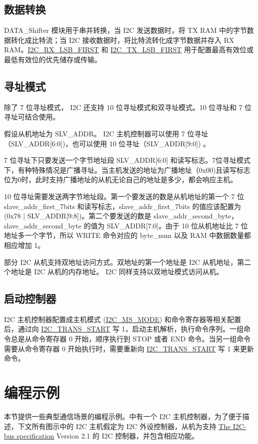 \documentclass[main\_\_CN.tex]{subfiles}
\begin{document}
\subsection{数据转换}
DATA\_Shifter 模块用于串并转换，当 I2C 发送数据时，将 TX RAM 中的字节数据转化成比特流；当 I2C 接收数据时，将比特流转化成字节数据并存入 RX RAM。\hyperref[fielddesc:I2CRXLSBFIRST]{I2C\_RX\_LSB\_FIRST} 和 \hyperref[fielddesc:I2CTXLSBFIRST]{I2C\_TX\_LSB\_FIRST} 用于配置最高有效位或最低有效位的优先储存或传输。

\subsection{寻址模式}
除了 7 位寻址模式，\chipname{} I2C 还支持 10 位寻址模式和双寻址模式。10 位寻址和 7 位寻址可结合使用。

假设从机地址为 SLV\_ADDR。 \chipname{} I2C 主机控制器可以使用 7 位寻址（SLV\_ADDR[6:0])，也可以使用 10 位寻址（SLV\_ADDR[9:0]) 。

7 位寻址下只要发送一个字节地址段 SLV\_ADDR[6:0] 和读写标志。7位寻址模式下，有种特殊情况是广播寻址。当主机发送的地址为广播地址（0x00)且读写标志位为0时，此时支持广播地址的从机无论自己的地址是多少，都会响应主机。

10 位寻址需要发送两字节地址段。第一个要发送的数是从机地址的第一个 7 位 slave\_addr\_first\_7bits 和读写标志，slave\_addr\_first\_7bits 的值应该配置为 (0x78 | SLV\_ADDR[9:8])。第二个要发送的数是 slave\_addr\_second\_byte，slave\_addr\_second\_byte 的值为 SLV\_ADDR[7:0]。由于 10 位从机地址比 7 位地址多一个字节，所以 WRITE 命令对应的 byte\_num 以及 RAM 中数据数量都相应增加 1。

部分 I2C 从机支持双地址访问方式。双地址的第一个地址是 I2C 从机地址，第二个地址是 I2C 从机的内存地址。\chipname{} I2C 同样支持以双地址模式访问从机。



\subsection{启动控制器}
\label{subsubsec:i2c-start}
I2C 主机控制器配置成主机模式 (\hyperref[fielddesc:I2CMSMODE]{I2C\_MS\_MODE}) 和命令寄存器等相关配置后，通过向 \hyperref[fielddesc:I2CTRANSSTART]{I2C\_TRANS\_START} 写 1，启动主机解析，执行命令序列。一组命令总是从命令寄存器 0 开始，顺序执行到 STOP 或者 END 命令。当另一组命令需要从命令寄存器 0 开始执行时，需要重新向 \hyperref[fielddesc:I2CTRANSSTART]{I2C\_TRANS\_START} 写 1 来更新命令。

\section{编程示例}
本节提供一些典型通信场景的编程示例。\chipname{}中有一个 I2C 主机控制器，为了便于描述，下文所有图示中的 I2C 主机假定为\chipname{} I2C 外设控制器，从机为支持 \href{https://www.csd.uoc.gr/~hy428/reading/i2c_spec.pdf}{The I2C-bus specification} Version 2.1 的 I2C 控制器，并包含相应功能。
\end{document}
